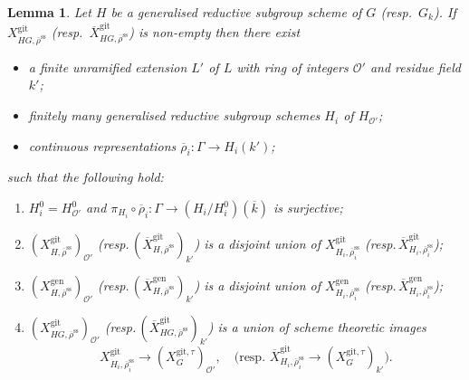 \documentclass{amsart}
\newtheorem{lem}[prop]{Lemma}
\theoremstyle{definition}
\theoremstyle{remark}
\newcommand{\OO}{\mathcal O}
\newcommand{\rhobar}{\overline{\rho}}
\newcommand{\gen}{\mathrm{gen}}
\newcommand{\gps}{\mathrm{git}}
\newcommand{\Xbar}{\overline{X}}
\newcommand{\rhobarss}{\rhobar^{\mathrm{ss}}}
\begin{document}
\begin{lem}\label{cover_Hi} Let $H$ be a generalised reductive subgroup scheme of $G$ (resp.~$G_k$). If 
$X^{\gps}_{HG, \rhobarss}$ (resp.~$\Xbar^{\gps}_{HG, \rhobarss}$) is non-empty then 
there exist 
\begin{itemize}
\item[(a)] a finite unramified extension $L'$ of $L$ with ring of integers $\OO'$ and residue field $k'$;
\item [(b)] finitely many generalised reductive subgroup schemes $H_i$ of $H_{\OO'}$;
\item [(c)] continuous representations 
$\rhobar_i: \Gamma \rightarrow H_i(k')$;
\end{itemize}
such that the following hold: 
\begin{enumerate} 
\item $H_i^0=H^0_{\OO'}$ and $\pi_{H_i}\circ \rhobar_i: \Gamma \rightarrow (H_i/H_i^0)(\overline{k})$ is surjective;
\item $(X^{\gps}_{H, \rhobarss})_{\OO'}$ (resp.\,$(\Xbar^{\gps}_{H, \rhobarss})_{k'}$) is a disjoint union 
of $X^{\gps}_{H_i, \rhobarss_i}$ (resp.\,$\Xbar^{\gps}_{H_i, \rhobarss_i}$);
\item $(X^{\gen}_{H, \rhobarss})_{\OO'}$ (resp.\,$(\Xbar^{\gen}_{H, \rhobarss})_{k'}$)  is a disjoint union of $X^{\gen}_{H_i, \rhobarss_i}$ (resp.\,$\Xbar^{\gen}_{H_i, \rhobarss_i}$);
\item $(X^{\gps}_{HG, \rhobarss})_{\OO'}$ (resp.\,$(\Xbar^{\gps}_{HG, \rhobarss})_{k'}$) is a union of scheme theoretic images 
$$X^{\gps}_{H_i, \rhobarss_i}\rightarrow (X^{\gps,\tau}_G)_{\OO'},\quad 
\text{(resp. }\Xbar^{\gps}_{H_i, \rhobarss_i}\rightarrow (X^{\gps,\tau}_G)_{k'}).$$
\end{enumerate} 
\end{lem}
\end{document}
